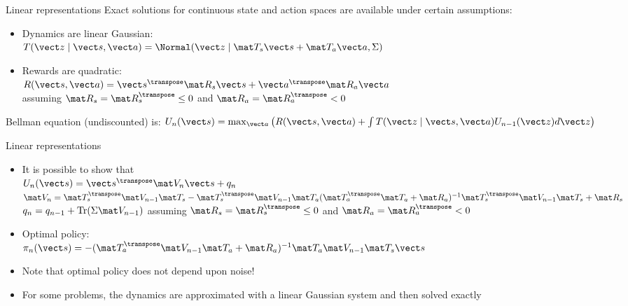 \documentclass[handout]{dmu}
\begin{document}
\begin{frame}{Linear representations}
Exact solutions for continuous state and action spaces are available under certain assumptions:
\begin{itemize}
\item<1-> Dynamics are \alert{linear Gaussian}: \\ $T(\vect z \mid \vect s, \vect a) = \Normal(\vect z \mid \mat T_s \vect s + \mat T_a \vect a, \Sigma)$
\item<2-> Rewards are \alert{quadratic}: \\ $R(\vect s, \vect a) = \vect s^\transpose \mat R_s \vect s + \vect a^\transpose \mat R_a \vect a$\\
assuming $\mat R_s = \mat R_s^\transpose \leq 0$ and $\mat R_a = \mat R_a^\transpose < 0$
\end{itemize}
Bellman equation (undiscounted) is:
$U_n(\vect s) = \max_{\vect a} \left(R(\vect s, \vect a) + \int T(\vect z \mid \vect s, \vect a) U_{n-1}(\vect z) d\vect z\right)$
\end{frame}

\begin{frame}{Linear representations}
\begin{itemize}
\item<1-> It is possible to show that\\ $U_n(\vect s) = \vect s^\transpose \mat V_n \vect s +  q_n$ \\
$\mat V_n = \mat T_s^\transpose \mat V_{n-1} \mat T_s - \mat T_s^\transpose \mat V_{n-1} \mat T_a(\mat T_a^\transpose \mat T_a + \mat R_a)^{-1}\mat T_s^\transpose \mat V_{n-1} \mat T_s + \mat R_s$
$q_n = q_{n-1} + \mathrm{Tr}(\Sigma \mat V_{n-1})$
assuming $\mat R_s = \mat R_s^\transpose \leq 0$ and $\mat R_a = \mat R_a^\transpose < 0$
\item<2-> Optimal policy: \\ $\pi_n(\vect s) = -(\mat T_a^\transpose \mat  V_{n-1} \mat T_a + \mat R_a)^{-1}\mat T_a \mat V_{n-1} \mat T_s \vect s$
\item<3-> Note that optimal policy does not depend upon noise!
\item<4-> For some problems, the dynamics are approximated with a linear Gaussian system and then solved exactly
\end{itemize}
\end{frame}
\end{document}
